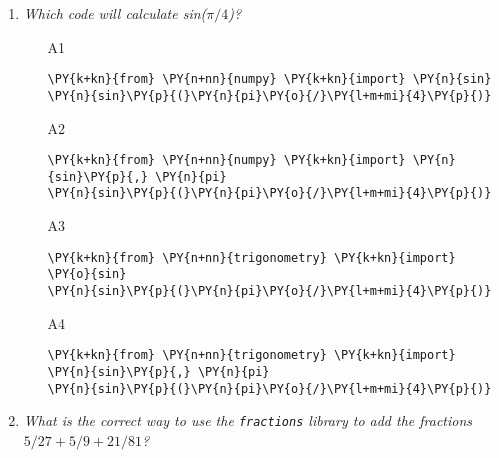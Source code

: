 \begin{enumerate}
\vspace{6mm}

\item {\em Which code will calculate sin($\pi/4$)?}\\

\begin{enumerate}
\item[A1] 
\begin{Verbatim}[commandchars=\\\{\}]
\PY{k+kn}{from} \PY{n+nn}{numpy} \PY{k+kn}{import} \PY{n}{sin}
\PY{n}{sin}\PY{p}{(}\PY{n}{pi}\PY{o}{/}\PY{l+m+mi}{4}\PY{p}{)}
\end{Verbatim}
\item[A2] 
\begin{Verbatim}[commandchars=\\\{\}]
\PY{k+kn}{from} \PY{n+nn}{numpy} \PY{k+kn}{import} \PY{n}{sin}\PY{p}{,} \PY{n}{pi}
\PY{n}{sin}\PY{p}{(}\PY{n}{pi}\PY{o}{/}\PY{l+m+mi}{4}\PY{p}{)}
\end{Verbatim}
\item[A3] 
\begin{Verbatim}[commandchars=\\\{\}]
\PY{k+kn}{from} \PY{n+nn}{trigonometry} \PY{k+kn}{import} \PY{o}{sin}
\PY{n}{sin}\PY{p}{(}\PY{n}{pi}\PY{o}{/}\PY{l+m+mi}{4}\PY{p}{)}
\end{Verbatim}
\item[A4] 
\begin{Verbatim}[commandchars=\\\{\}]
\PY{k+kn}{from} \PY{n+nn}{trigonometry} \PY{k+kn}{import} \PY{n}{sin}\PY{p}{,} \PY{n}{pi}
\PY{n}{sin}\PY{p}{(}\PY{n}{pi}\PY{o}{/}\PY{l+m+mi}{4}\PY{p}{)}
\end{Verbatim}
\end{enumerate}

\vspace{6mm}

\item {\em What is the correct way to use the {\tt fractions} library to add the fractions 
$5/27 + 5/9 + 21/81$?}\\


\end{enumerate}
